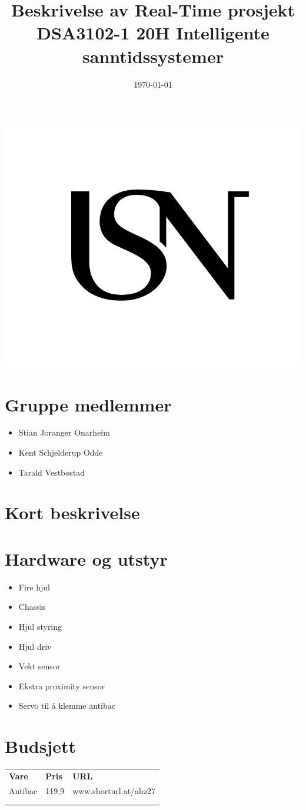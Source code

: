 \documentclass{article}
\title{Beskrivelse av Real-Time prosjekt \large\\
DSA3102-1 20H Intelligente sanntidssystemer}
\date{\today}
\begin{document}
\maketitle
\thispagestyle{empty}
\begin{center}
\includegraphics[width=\linewidth,height=0.2\textheight,keepaspectratio]{img/USN.png}
\end{center}


\newpage
\section{Gruppe medlemmer}
	\begin{itemize}
		\item{Stian Joranger Onarheim}
		\item{Kent Schjelderup Odde}
		\item{Tarald Vestbøstad}
	\end{itemize}
\newpage
\section{Kort beskrivelse}
\newpage
\section{Hardware og utstyr}
	\begin{itemize}
		\item{Fire hjul}
		\item{Chassis}
		\item{Hjul styring}
		\item{Hjul driv}
		\item{Vekt sensor}
		\item{Ekstra proximity sensor}
		\item{Servo til å klemme antibac}
	\end{itemize}
\newpage
\section{Budsjett}
\begin{table}[]
\begin{tabular}{lll}
\textbf{Vare} & \textbf{Pris} & \textbf{URL}      \\
Antibac       & 119,9         & www.shorturl.at/ahz27 \\
              &               &                   \\
              &               &                  
\end{tabular}
\end{table}
\end{document}
